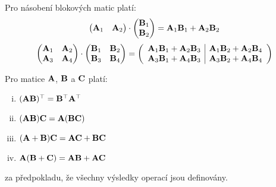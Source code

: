 \begin{proposition}
    Pro násobení blokových matic platí:
    $$\begin{pmatrix} \mathbf{A}_1 &\mathbf{A}_2 \end{pmatrix} \cdot \begin{pmatrix}
    \mathbf{B}_1 \\ \mathbf{B}_2 \end{pmatrix} 
    = \mathbf{A}_1\mathbf{B}_1 + \mathbf{A}_2\mathbf{B}_2$$
    $$\begin{pmatrix} 
        \mathbf{A}_1 &\mathbf{A}_2 \\ \mathbf{A}_3 &\mathbf{A}_4
    \end{pmatrix}
    \cdot 
    \begin{pmatrix} 
        \mathbf{B}_1 &\mathbf{B}_2 \\ \mathbf{B}_3 &\mathbf{B}_4 
    \end{pmatrix} =
    \left(\begin{array}{c|c}
        \mathbf{A}_1\mathbf{B}_1 + \mathbf{A}_2\mathbf{B}_3 
        &\mathbf{A}_1\mathbf{B}_2 + \mathbf{A}_2\mathbf{B}_4 \\
        \mathbf{A}_3\mathbf{B}_1 + \mathbf{A}_4\mathbf{B}_3
        &\mathbf{A}_3\mathbf{B}_2 + \mathbf{A}_4\mathbf{B}_4
    \end{array}\right)$$
\end{proposition}

\begin{proposition}
    Pro matice $\mathbf{A}$, $\mathbf{B}$ a $\mathbf{C}$ platí:
    \begin{multicols}{2}
        \begin{enumerate}[i.]
            \item $(\mathbf{A}\mathbf{B})^\top = \mathbf{B}^\top\mathbf{A}^\top$
            \item $(\mathbf{A}\mathbf{B})\mathbf{C} = \mathbf{A}(\mathbf{B}\mathbf{C})$
            \item $(\mathbf{A} + \mathbf{B})\mathbf{C} = \mathbf{A}\mathbf{C} + \mathbf{B}\mathbf{C}$
            \item $\mathbf{A}(\mathbf{B} + \mathbf{C}) = \mathbf{A}\mathbf{B} + \mathbf{A}\mathbf{C}$
        \end{enumerate}
    \end{multicols}
    za předpokladu, že všechny výsledky operací jsou definovány.
\end{proposition}

